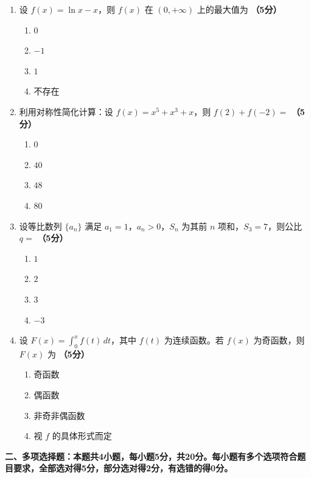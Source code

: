 \documentclass[12pt, a4paper]{ctexart}
\newcommand{\score}[1]{\hfill\textbf{（#1分）}}
\begin{document}
\begin{enumerate}
\item 设 $f(x)=\ln x-x$，则 $f(x)$ 在 $(0,+\infty)$ 上的最大值为 \score{5}
\begin{enumerate}[label=\Alph*.]
    \item $0$
    \item $-1$
    \item $1$
    \item 不存在
\end{enumerate}

\item 利用对称性简化计算：设 $f(x)=x^5+x^3+x$，则 $f(2)+f(-2)=$ \score{5}
\begin{enumerate}[label=\Alph*.]
    \item $0$
    \item $40$
    \item $48$
    \item $80$
\end{enumerate}

\item 设等比数列 $\{a_n\}$ 满足 $a_1=1$，$a_n>0$，$S_n$ 为其前 $n$ 项和，$S_3=7$，则公比 $q=$ \score{5}
\begin{enumerate}[label=\Alph*.]
    \item $1$
    \item $2$
    \item $3$
    \item $-3$
\end{enumerate}

\item 设 $F(x)=\displaystyle\int_0^x f(t)\,dt$，其中 $f(t)$ 为连续函数。若 $f(x)$ 为奇函数，则 $F(x)$ 为 \score{5}
\begin{enumerate}[label=\Alph*.]
    \item 奇函数
    \item 偶函数
    \item 非奇非偶函数
    \item 视 $f$ 的具体形式而定
\end{enumerate}

\end{enumerate}

\vspace{10pt}

{\large\bfseries 二、多项选择题：本题共4小题，每小题5分，共20分。每小题有多个选项符合题目要求，全部选对得5分，部分选对得2分，有选错的得0分。}

\vspace{8pt}
\end{document}
